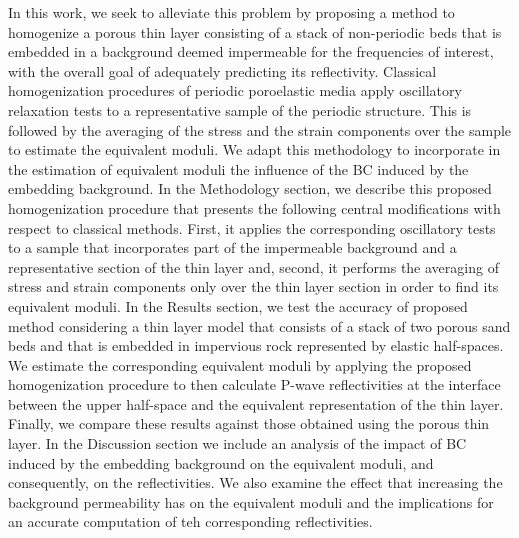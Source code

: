 \documentclass[draft]{agujournal2019}
\begin{document}
In this work, we seek to alleviate this problem by proposing a method to homogenize a porous thin layer consisting of a stack of non-periodic beds that is embedded in a background deemed impermeable for the frequencies of interest, with the overall goal of adequately predicting its reflectivity. Classical homogenization procedures of periodic poroelastic media apply oscillatory relaxation tests to a representative sample of the periodic structure. This is followed by the averaging of the stress and the strain components over the sample to estimate the equivalent moduli. We adapt this methodology to incorporate in the estimation of equivalent moduli the influence of the BC induced by the embedding background.
In the Methodology section, we describe this proposed homogenization procedure that presents the following central modifications with respect to classical methods. First, it applies the corresponding oscillatory tests to a sample that incorporates part of the impermeable background and a representative section of the 
thin layer and, second, it performs the averaging of stress and strain components only over the thin layer section in order to find its equivalent moduli. In the Results section, we
test the accuracy of proposed method considering a thin layer model that consists of a stack of two  porous sand beds and that is embedded in impervious rock represented by elastic half-spaces. We estimate the corresponding equivalent moduli by applying the proposed homogenization procedure to then calculate P-wave reflectivities at the interface between the upper half-space and the equivalent representation of the thin  layer. Finally, we compare these results against those obtained using the porous thin layer. In the Discussion section we include an analysis of the impact of BC induced by the embedding background on the equivalent moduli, and consequently, on the reflectivities. We also examine the effect that increasing the background permeability has on  the equivalent moduli and the implications for an accurate computation of teh corresponding reflectivities.
\end{document}
